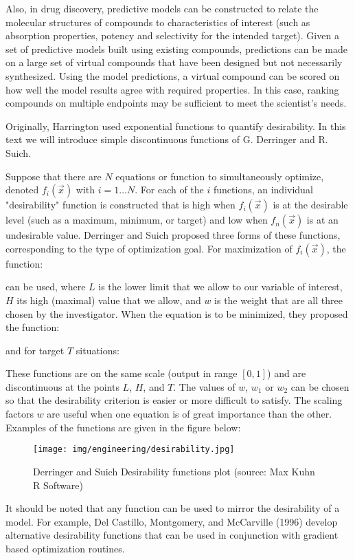 	Also, in drug discovery, predictive models can be constructed to relate the molecular structures of compounds to characteristics of interest (such as absorption properties, potency and selectivity for the intended target). Given a set of predictive models built using existing compounds, predictions can be made on a large set of virtual compounds that have been designed but not necessarily synthesized. Using the model predictions, a virtual compound can be scored on how well the model results agree with required properties. In this case, ranking compounds on multiple endpoints may be sufficient to meet the scientist's needs.
	
	Originally, Harrington used exponential functions to quantify desirability. In this text we will introduce simple discontinuous functions of G. Derringer and R. Suich.

	Suppose that there are $N$ equations or function to simultaneously optimize, denoted $f_i(\vec{x})$ with $i= 1 \ldots N$. For each of the $i$ functions, an individual "desirability" function is constructed that is high when $f_i(\vec{x})$ is at the desirable level (such as a maximum, minimum, or target) and low when $f_n(\vec{x})$ is at an undesirable value. Derringer and Suich proposed three forms of these functions, corresponding to the type of optimization goal. For maximization of $f_i(\vec{x})$, the function:
	
	can be used, where $L$ is the lower limit that we allow to our variable of interest, $H$ its high (maximal) value that we allow, and $w$ is the weight that are all three chosen by the investigator. When the equation is to be minimized, they proposed the function:
	
	and for target $T$ situations:
	
	These functions are on the same scale (output in range $[0,1]$) and are discontinuous at the points $L$, $H$, and $T$. The values
of $w$, $w_1$ or $w_2$ can be chosen so that the desirability criterion is easier or more difficult to satisfy. The scaling factors $w$ are useful when one equation is of great importance than the other. Examples of the functions are given in the figure below:
	\begin{figure}[H]
		\centering
		\texttt{[image: img/engineering/desirability.jpg]}
		\caption{Derringer and Suich Desirability functions plot (source: Max Kuhn R Software)}	
	\end{figure}
	It should be noted that any function can be used to mirror the desirability of a model. For example, Del Castillo, Montgomery, and McCarville (1996) develop alternative desirability functions that can be used in conjunction with gradient based optimization routines.

